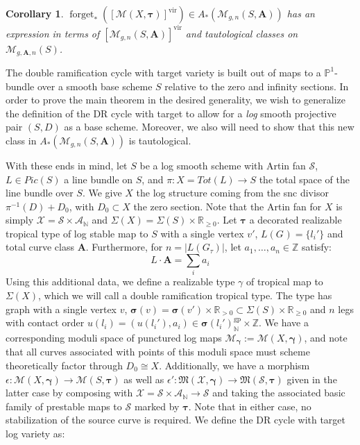 \documentclass[12pt, oneside]{amsart}   	%
\newcounter{thm}
\newtheorem{corollary}[thm]{Corollary}
\newcommand{\NN}{\mathbb{N}}
\newcommand{\ZZ}{\mathbb{Z}}
\newcommand{\vir}{\operatorname{vir}}
\newcommand{\gp}{\operatorname{gp}}
\newcommand{\forget}{\operatorname{forget}}
\numberwithin{equation}{section}
\numberwithin{thm}{section}
\numberwithin{figure}{section}
\begin{document}
\begin{corollary}
$\forget_*([\mathscr{M}(X,\pmb\tau)]^{\vir}) \in A_*(\mathscr{M}_{g,n}(S,\textbf{A}))$ has an expression in terms of $[\mathscr{M}_{g,n}(S,\textbf{A})]^{\vir}$ and tautological classes on $\mathscr{M}_{g,\textbf{A},n}(S)$. 
\end{corollary}

The double ramification cycle with target variety is built out of maps to a $\mathbb{P}^1$-bundle over a smooth base scheme $S$ relative to the zero and infinity sections. In order to prove the main theorem in the desired generality, we wish to generalize the definition of the DR cycle with target to allow for a \emph{log} smooth projective pair $(S,D)$ as a base scheme. Moreover, we also will need to show that this new class in $A_*(\mathscr{M}_{g,n}(S,\textbf{A}))$ is tautological. 

With these ends in mind, let $S$ be a log smooth scheme with Artin fan $\mathcal{S}$, $L \in Pic(S)$ a line bundle on $S$, and $\pi: X = Tot(L) \rightarrow S$ the total space of the line bundle over $S$. We give $X$ the log structure coming from the snc divisor $\pi^{-1}(D) + D_0$, with $D_0 \subset X$ the zero section. Note that the Artin fan for $X$ is simply $\mathcal{X} = \mathcal{S}\times \mathcal{A}_{\NN}$ and $\Sigma(X) = \Sigma(S) \times \mathbb{R}_{\ge 0}$. Let $\pmb\tau$ a decorated realizable tropical type of log stable map to $S$ with a single vertex $v'$, $L(G_{})= \{l_i'\}$ and total curve class $\textbf{A}$. Furthermore, for $n = |L(G_{\tau})|$, let $a_1,\ldots,a_n \in \ZZ$ satisfy:
\[L\cdot \textbf{A} = \sum_i a_i\]
Using this additional data, we define a realizable type $\gamma$ of tropical map to $\Sigma(X)$, which we will call a double ramification tropical type. The type has graph with a single vertex $v$, $\pmb\sigma(v) = \pmb\sigma(v') \times \mathbb{R}_{> 0} \subset \Sigma(S) \times \mathbb{R}_{\ge 0}$ and $n$ legs with contact order $u({l_i}) = (u({l_i'}),a_i) \in \pmb\sigma(l_i')^{\gp}_{\NN} \times \ZZ$. We have a corresponding moduli space of punctured log maps $\mathscr{M}_{\pmb\gamma}:=\mathscr{M}(X,\pmb\gamma)$, and note that all curves associated with points of this moduli space must scheme theoretically factor through $D_0 \cong X$. Additionally, we have a morphism $\epsilon: \mathscr{M}(X,\pmb\gamma) \rightarrow \mathscr{M}(S,\pmb\tau)$ as well as $\epsilon':\mathfrak{M}(\mathcal{X},\pmb\gamma) \rightarrow \mathfrak{M}(\mathcal{S},\pmb\tau)$ given in the latter case by composing with $\mathcal{X} = \mathcal{S}\times \mathcal{A}_{\NN} \rightarrow \mathcal{S}$ and taking the associated basic family of prestable maps to $\mathcal{S}$ marked by $\pmb\tau$. Note that in either case, no stabilization of the source curve is required. We define the DR cycle with target log variety as:
\end{document}
